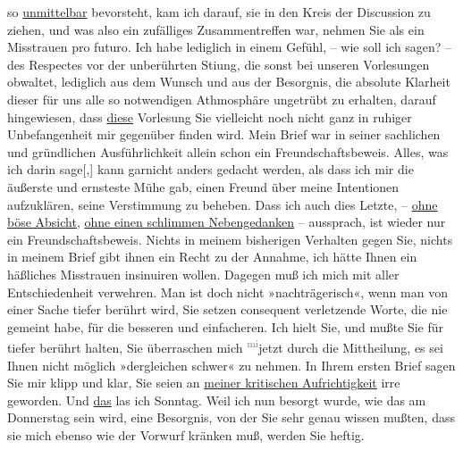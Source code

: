 \begin{ledgroupsized}[t]{13cm}
{{{               }}}\label{K_L03355-3h} so \uline{unmittelbar} bevorsteht, kam ich darauf,
               sie in den Kreis der Discussion zu ziehen, und was also ein zufälliges
               Zusammentreffen war, nehmen Sie als ein Misstrauen pro futuro.\pend
           \pstart
           Ich habe lediglich in einem Gefühl, – wie soll ich sagen? – des Respectes vor der
               unberührten Sti{\geminationm}ung, die sonst bei unseren Vorlesungen
               obwaltet, lediglich aus dem Wunsch und aus der Besorgnis, die absolute Klarheit
               dieser für uns alle so notwendigen Athmosphäre ungetrübt zu erhalten, darauf
               hingewiesen, dass \uline{diese} Vorlesung Sie vielleicht noch
               nicht ganz in ruhiger Unbefangenheit mir gegenüber finden wird.\pend
           \pstart
           Mein Brief war in seiner sachlichen und gründlichen Ausführlichkeit allein schon ein
               Freundschaftsbeweis. Alles, was ich darin sage{[},{]} kann garnicht
               anders gedacht werden, als dass ich mir die äußerste und ernsteste Mühe gab, einen
               Freund über meine {\pb}Intentionen
               aufzuklären, seine Verstimmung zu beheben. Dass ich auch dies Letzte, – \uline{ohne böse Absicht}, \uline{ohne
                  einen schlimmen Nebengedanken} – aussprach, ist wieder nur ein
               Freundschaftsbeweis. Nichts in meinem bisherigen Verhalten gegen Sie, nichts in
               meinem Brief gibt ihnen ein Recht zu der Annahme, ich hätte Ihnen ein häßliches
               Misstrauen insinuiren wollen. Dagegen muß ich mich mit aller Entschiedenheit
               verwehren.\pend
           \pstart
           Man ist doch nicht »nachträgerisch«, wenn man von einer Sache tiefer berührt wird,
               Sie setzen consequent verletzende Worte, die  nie
               gemeint habe, für die besseren und einfacheren.\pend
           \pstart
           Ich hielt Sie, und mußte Sie für tiefer berührt halten, Sie überraschen mich \substVorne{}\textsuperscript{\textcolor{gray}{mi}}\substDazwischen{}jetzt\substHinten{} durch die Mittheilung, es sei Ihnen nicht möglich »dergleichen schwer« zu
               nehmen.\pend
           \pstart
           In Ihrem ersten Brief sagen Sie mir klipp und klar, Sie seien an \uline{meiner kritischen Aufrichtigkeit} irre geworden. Und \uline{das} las ich Sonntag.
               Weil ich nun besorgt wurde, wie das am Donnerstag sein
               wird, eine Besorgnis, von der Sie sehr genau wissen mußten, dass sie mich ebenso wie
               der Vorwurf kränken muß, werden Sie heftig.\pend

\end{ledgroupsized}
